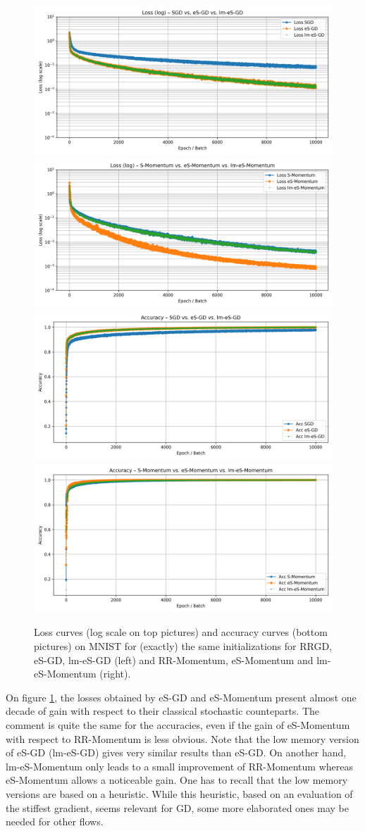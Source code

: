 \documentclass[article,authoryear,jmlmc]{beg_32}             %
\begin{document}
\begin{figure}[!h]
 \includegraphics[width=0.5\linewidth]{chapitre5_img/GD_loss_log.png}
 \includegraphics[width=0.5\linewidth]{chapitre5_img/Momentum_loss_log.png}\\
 \includegraphics[width=0.5\linewidth]{chapitre5_img/GD_accuracy.png}
 \includegraphics[width=0.5\linewidth]{chapitre5_img/Momentum_accuracy.png}\\
  \caption{Loss curves (log scale on top pictures) and accuracy curves (bottom pictures) on MNIST for (exactly) the same initializations for RRGD, eS-GD, lm-eS-GD (left) and
  RR-Momentum, eS-Momentum and lm-eS-Momentum (right).}
  \label{mnist}
\end{figure}

On figure \ref{mnist}, the losses obtained by eS-GD and eS-Momentum present almost one decade of gain with respect to their classical stochastic counteparts.  
The comment is quite the same for the accuracies, even if the gain of eS-Momentum with respect to RR-Momentum is less obvious. 
Note that the low memory version of eS-GD (lm-eS-GD) gives very similar results than eS-GD. On another hand, lm-eS-Momentum only leads to a small improvement of RR-Momentum whereas
eS-Momentum allows a noticeable gain. 
One has to recall that the low memory versions are based on a heuristic. While this heuristic, based on an evaluation of the stiffest gradient, seems relevant
for GD, some more elaborated ones may be needed for other flows. 
\end{document}
